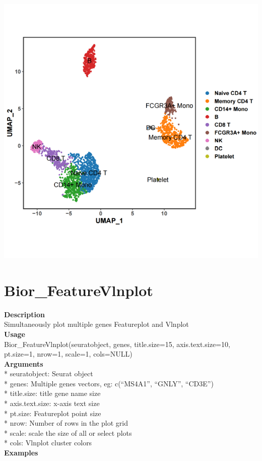 \documentclass[
]{book}
\begin{document}
\includegraphics{images/Bior_DimPlot.png}

\hypertarget{bior_featurevlnplot}{%
\section{Bior\_FeatureVlnplot}\label{bior_featurevlnplot}}

\textbf{Description}\\
Simultaneously plot multiple genes Featureplot and Vlnplot\\
\textbf{Usage}\\
Bior\_FeatureVlnplot(seuratobject, genes, title.size=15, axis.text.size=10, pt.size=1, nrow=1, scale=1, cols=NULL)\\
\textbf{Arguments}\\
* seuratobject: Seurat object\\
* genes: Multiple genes vectors, eg: c(``MS4A1'', ``GNLY'', ``CD3E'')\\
* title.size: title gene name size\\
* axis.text.size: x-axis text size\\
* pt.size: Featureplot point size\\
* nrow: Number of rows in the plot grid\\
* scale: scale the size of all or select plots\\
* cols: Vlnplot cluster colors\\
\textbf{Examples}\\
\end{document}
